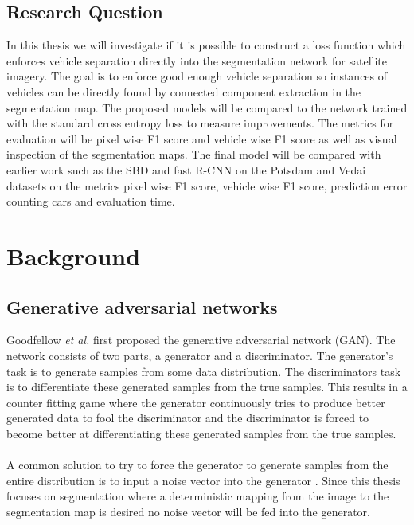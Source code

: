 \documentclass{kththesis}
\begin{document}
\section{Research Question}
In this thesis we will investigate if it is possible to construct a loss function which enforces vehicle separation directly into the segmentation network for satellite imagery. The goal is to enforce  good enough vehicle separation so instances of vehicles can be directly found by connected component extraction in the segmentation map. The proposed models will be compared to the network trained with the standard cross entropy loss to measure improvements. The metrics for evaluation will be pixel wise F1 score and vehicle wise F1 score as well as visual inspection of the segmentation maps. The final model will be compared with earlier work such as the SBD and fast R-CNN on the Potsdam and Vedai datasets on the metrics pixel wise F1 score, vehicle wise F1 score, prediction error counting cars and evaluation time.
\chapter{Background}
\section{Generative adversarial networks}
Goodfellow \textit{et al.} \parencite{goodfellow_nips_2016} first proposed the generative adversarial network (GAN). The network consists of two parts, a generator and a discriminator. The generator's task is to generate samples from some data distribution. The discriminators task is to differentiate these generated samples from the true samples. This results in a counter fitting game where the generator continuously tries to produce better generated data to fool the discriminator and the discriminator is forced to become better at differentiating these generated samples from the true samples.\\
\\
A common solution to try to force the generator to generate samples from the entire distribution is to input a noise vector into the generator \parencite{reed_generative_2016}. Since this thesis focuses on segmentation where a deterministic mapping from the image to the segmentation map is desired no noise vector will be fed into the generator.
\end{document}
